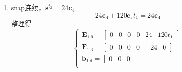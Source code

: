 \documentclass[40pt,a4paper,UTF8,twocolumn]{ctexart}%
\numberwithin{equation}{section}
\begin{document}
\begin{enumerate}
    \item snap连续，$\bm s^{t_2}=24\bm c_4$
    \begin{equation}
        24\bm c_4+120\bm c_5t_1 = 24\bm c_4
    \end{equation}
    整理得
    \begin{equation}
        \left\{
            \begin{array}{l}
                \bm E_{1\_6}=
                \begin{bmatrix}
                    0&0&0&0&24&120t_1
                \end{bmatrix}\\
                \bm F_{1\_6}=
                \begin{bmatrix}
                    0&0&0&0&-24&0
                \end{bmatrix}\\
                \bm b_{1\_6} = 
                \begin{bmatrix}
                    0 & 0 & 0
                \end{bmatrix}\\
            \end{array}
        \right.
        \label{eq1.6} %
    \end{equation}


\end{enumerate}
\end{document}
